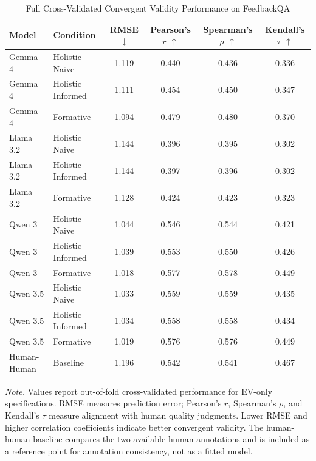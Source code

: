 \begin{table}[htbp]
    \centering
    \caption{Full Cross-Validated Convergent Validity Performance on FeedbackQA}
    \label{tab:feedbackqa_cv_full}
    \begin{tabular}{llcccc}
    \toprule
    Model & Condition & RMSE $\downarrow$ & Pearson's $r$ $\uparrow$ & Spearman's $\rho$ $\uparrow$ & Kendall's $\tau$ $\uparrow$ \\
    \midrule
    Gemma 4 & Holistic Naive & 1.119 & 0.440 & 0.436 & 0.336 \\
    Gemma 4 & Holistic Informed & 1.111 & 0.454 & 0.450 & 0.347 \\
    Gemma 4 & Formative & 1.094 & 0.479 & 0.480 & 0.370 \\
    Llama 3.2 & Holistic Naive & 1.144 & 0.396 & 0.395 & 0.302 \\
    Llama 3.2 & Holistic Informed & 1.144 & 0.397 & 0.396 & 0.302 \\
    Llama 3.2 & Formative & 1.128 & 0.424 & 0.423 & 0.323 \\
    Qwen 3 & Holistic Naive & 1.044 & 0.546 & 0.544 & 0.421 \\
    Qwen 3 & Holistic Informed & 1.039 & 0.553 & 0.550 & 0.426 \\
    Qwen 3 & Formative & 1.018 & 0.577 & 0.578 & 0.449 \\
    Qwen 3.5 & Holistic Naive & 1.033 & 0.559 & 0.559 & 0.435 \\
    Qwen 3.5 & Holistic Informed & 1.034 & 0.558 & 0.558 & 0.434 \\
    Qwen 3.5 & Formative & 1.019 & 0.576 & 0.576 & 0.449 \\
    \addlinespace[0.4em]
    Human-Human & Baseline & 1.196 & 0.542 & 0.541 & 0.467 \\
    \bottomrule
    \end{tabular}

    \begin{flushleft}
    \footnotesize
    \textit{Note.} Values report out-of-fold cross-validated performance for EV-only specifications. RMSE measures prediction error; Pearson's $r$, Spearman's $\rho$, and Kendall's $\tau$ measure alignment with human quality judgments. Lower RMSE and higher correlation coefficients indicate better convergent validity. The human-human baseline compares the two available human annotations and is included as a reference point for annotation consistency, not as a fitted model.
    \end{flushleft}
\end{table}



